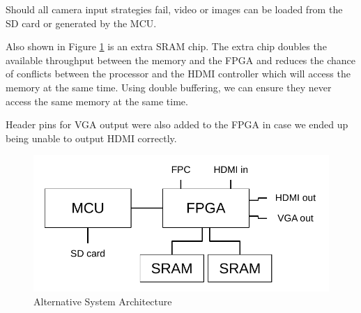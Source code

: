 Should all camera input strategies fail, video or images can be loaded from the SD card or generated by the MCU.

Also shown in Figure \ref{fig:SystemArchitectureAlternative} is an extra SRAM chip.
The extra chip doubles the available throughput between the memory and the FPGA and reduces the chance of conflicts between the processor and the HDMI controller which will access the memory at the same time. Using double buffering, we can ensure they never access the same memory at the same time.

Header pins for VGA output were also added to the FPGA in case we ended up being unable to output HDMI correctly.

\begin{figure}
    \centering
    \includegraphics{img/SystemArchitectureAlternative.pdf}
    \caption{Alternative System Architecture}
    \label{fig:SystemArchitectureAlternative}
\end{figure}
